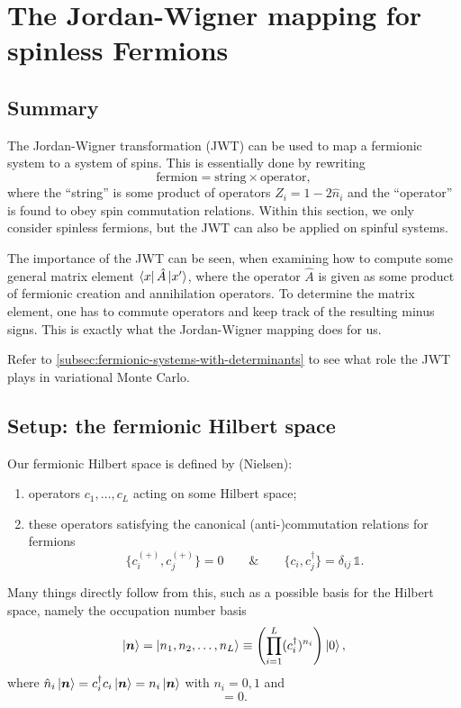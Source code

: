 \documentclass[../../main.tex]{subfiles}
\begin{document}
\section{The Jordan-Wigner mapping for spinless Fermions}
\label{sec:jordan-wigner}

\subsection{Summary}

The Jordan-Wigner transformation (JWT) can be used to map a fermionic system to a system of spins. This is essentially done by rewriting
\begin{equation*}
\text{fermion}=\text{string}\times\text{operator},
\end{equation*}
where the ``string'' is some product of operators $\hat Z_i=1-2\hat n_i$ and the ``operator'' is found to obey spin commutation relations. Within this section, we only consider spinless fermions, but the JWT can also be applied on spinful systems. 

The importance of the JWT can be seen, when examining how to compute some general matrix element $\left\langle x \right\rvert \hat A \left\lvert x' \right\rangle$, where the operator $\hat A$ is given as some product of fermionic creation and annihilation operators. To determine the matrix element, one has to commute operators and keep track of the resulting minus signs. This is exactly what the Jordan-Wigner mapping does for us.

Refer to \cref{subsec:fermionic-systems-with-determinants} to see what role the JWT plays in variational Monte Carlo. 


\subsection{Setup: the fermionic Hilbert space}

Our fermionic Hilbert space is defined by (Nielsen):
\begin{enumerate}
\item[i)] operators $c_1,\dots,c_L$ acting on some Hilbert space;
\item[ii)] these operators satisfying the canonical (anti-)commutation relations for
fermions
\begin{equation}
\{c_i^{(+)},c_j^{(+)}\}=0\qquad\&\qquad\{c_i,c_j^\dagger\}=\delta_{ij}\,\mathds{1}.
\end{equation}
\end{enumerate}
Many things directly follow from this, such as a possible basis for the Hilbert space, namely
the occupation number basis
\begin{equation}
\left\lvert \bm{n} \right\rangle=\left\lvert n_1,n_2,\dots,n_L \right\rangle\equiv\left(\prod_{i=1}^{L}(c_i^\dagger)^{n_i}\right)\left\lvert 0 \right\rangle,
\end{equation}
where $\hat n_i\left\lvert \bm{n} \right\rangle=c_i^\dagger c_i\left\lvert \bm{n} \right\rangle=n_i\left\lvert \bm{n} \right\rangle$ with $n_i=0,1$ and
\begin{equation}
[\hat n_i,\hat n_j]=0.\label{eq:jw-nn}
\end{equation}
\end{document}
